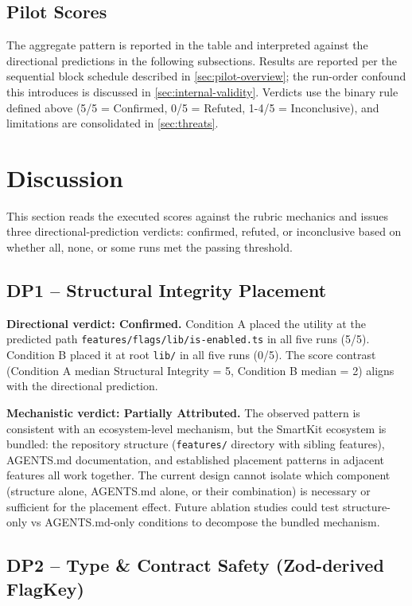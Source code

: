 \documentclass[12pt,a4paper]{report}
\DeclareRobustCommand{\filename}[1]{\bgroup\urlstyle{tt}\nolinkurl{#1}\egroup}
\begin{document}
\subsection{Pilot Scores}

The aggregate pattern is reported in the table and interpreted against the directional predictions in the following subsections. Results are reported per the sequential block schedule described in \autoref{sec:pilot-overview}; the run-order confound this introduces is discussed in \autoref{sec:internal-validity}. Verdicts use the binary rule defined above (5/5 = Confirmed, 0/5 = Refuted, 1-4/5 = Inconclusive), and limitations are consolidated in \autoref{sec:threats}.

\section{Discussion}
\label{sec:discussion}

This section reads the executed scores against the rubric mechanics and issues three directional-prediction verdicts: confirmed, refuted, or inconclusive based on whether all, none, or some runs met the passing threshold.

\subsection{DP1 -- Structural Integrity Placement}
\label{sec:dp1-results}

\textbf{Directional verdict: Confirmed.} Condition A placed the utility at the predicted path \filename{features/flags/lib/is-enabled.ts} in all five runs (5/5). Condition B placed it at root \filename{lib/} in all five runs (0/5). The score contrast (Condition A median Structural Integrity = 5, Condition B median = 2) aligns with the directional prediction.

\textbf{Mechanistic verdict: Partially Attributed.} The observed pattern is consistent with an ecosystem-level mechanism, but the SmartKit ecosystem is bundled: the repository structure (\filename{features/} directory with sibling features), AGENTS.md documentation, and established placement patterns in adjacent features all work together. The current design cannot isolate which component (structure alone, AGENTS.md alone, or their combination) is necessary or sufficient for the placement effect. Future ablation studies could test structure-only vs AGENTS.md-only conditions to decompose the bundled mechanism.

\subsection{DP2 -- Type \& Contract Safety (Zod-derived FlagKey)}
\label{sec:dp2-results}
\end{document}
